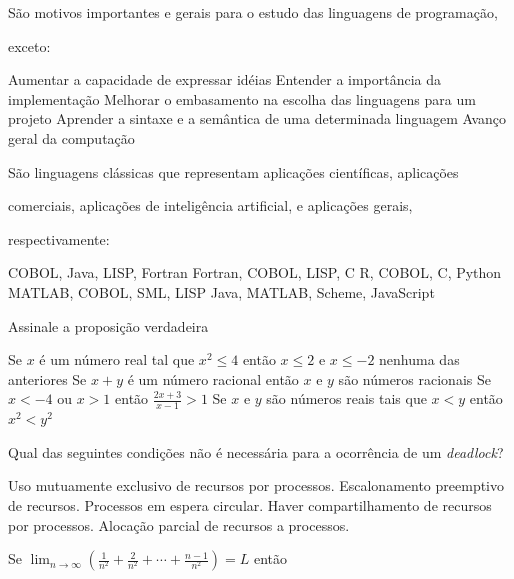 \documentclass[12pt, addpoints]{exam}
\begin{document}
\begin{questions}
\question

São motivos importantes e gerais para o estudo das linguagens de programação,

exceto:
\begin{choices}
\choice Aumentar a capacidade de expressar idéias
\choice Entender a importância da implementação
\choice Melhorar o embasamento na escolha das linguagens para um projeto
\choice Aprender a sintaxe e a semântica de uma determinada linguagem
\choice Avanço geral da computação
\end{choices}

\question

São linguagens clássicas que representam aplicações científicas, aplicações 

comerciais, aplicações de inteligência artificial, e aplicações gerais,

respectivamente:
\begin{choices}
\choice COBOL, Java, LISP, Fortran
\choice Fortran, COBOL, LISP, C
\choice R, COBOL, C, Python
\choice MATLAB, COBOL, SML, LISP
\choice Java, MATLAB, Scheme, JavaScript
\end{choices}

\question

Assinale a proposição verdadeira


\begin{choices}
\choice Se \( x \) é um número real tal que \( x^2 \leq 4 \) então \( x \leq 2 \) e \( x \leq -2 \)
\choice nenhuma das anteriores
\choice Se \( x + y \) é um número racional então \( x \) e \( y \) são números racionais
\choice Se \( x < -4 \) ou \( x > 1 \) então \( \frac{2x + 3}{x - 1} > 1 \)
\choice Se \( x \) e \( y \) são números reais tais que \( x < y \) então \( x^2 < y^2 \)
\end{choices}

\question

Qual das seguintes condições não é necessária para a ocorrência de um \textit{deadlock}?


\begin{choices}
\choice Uso mutuamente exclusivo de recursos por processos.
\choice Escalonamento preemptivo de recursos.
\choice Processos em espera circular.
\choice Haver compartilhamento de recursos por processos.
\choice Alocação parcial de recursos a processos.
\end{choices}

\question

Se \( \lim_{n \to \infty} \left( \frac{1}{n^2} + \frac{2}{n^2} + \cdots + \frac{n-1}{n^2} \right) = L \) então



\end{questions}
\end{document}
